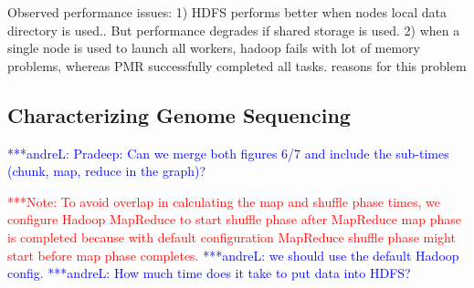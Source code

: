 \documentclass{acm_proc_article-sp}
\newcommand{\alnote}[1]{ {\textcolor{blue} { ***andreL: #1 }}}
\newcommand{\pnote}[1]{ {\textcolor{magenta} { ***pradeep: #1 }}}
\newcommand{\note}[1]{ {\textcolor{red} { ***Note: #1 }}}
\newcommand{\alnote}[1]{}
\newcommand{\pnote}[1]{}
\newcommand{\note}[1]{}
\begin{document}



Observed performance issues:
1) HDFS performs better when nodes local data directory is used.. But performance degrades if shared storage is used. 			
2) when a single node is used to launch all workers, hadoop fails with lot of memory problems, whereas PMR successfully completed all tasks.			
reasons for this problem




\subsection{Characterizing Genome Sequencing}

\alnote{Pradeep: Can we merge both figures 6/7 and include the sub-times 
(chunk, map, reduce in the graph)?}

\note{To avoid overlap in calculating the map and shuffle phase times, we
configure Hadoop MapReduce to start shuffle phase after MapReduce map phase is
completed because with default configuration MapReduce shuffle phase might
start before map phase completes.}\alnote{we should use the default Hadoop 
config.}
\alnote{How much time does it take to put data into HDFS?}
\end{document}
